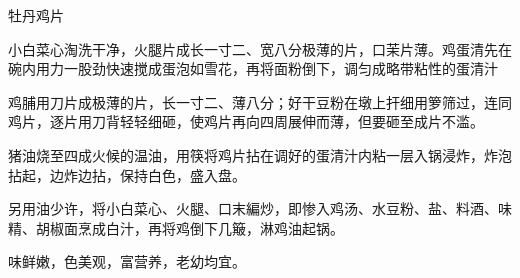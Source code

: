 \begin{recipe}{牡丹鸡片}

\ingredients


\preparation

\step 小白菜心淘洗干净，火腿片成长一寸二、宽八分极薄的片，口茉片薄。鸡蛋清先在
碗内用力一股劲快速搅成蛋泡如雪花，再将面粉倒下，调匀成略带粘性的蛋清汁

\step 鸡脯用刀片成极薄的片，长一寸二、薄八分；好干豆粉在墩上扞细用箩筛过，连同
鸡片，逐片用刀背轻轻细砸，使鸡片再向四周展伸而薄，但要砸至成片不滥。

\step 猪油烧至四成火候的温油，用筷将鸡片拈在调好的蛋清汁内粘一层入锅浸炸，炸泡
拈起，边炸边拈，保持白色，盛入盘。

\step 另用油少许，将小白菜心、火腿、口末編炒，即惨入鸡汤、水豆粉、盐、料酒、味
精、胡椒面烹成白汁，再将鸡倒下几簸，淋鸡油起锅。

\features

味鲜嫩，色美观，富营养，老幼均宜。

\end{recipe}

